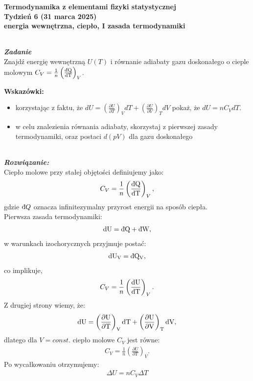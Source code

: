 \documentclass[11pt,a4paper]{article}
\newcounter{zadanie}\newcommand{\zadanie}[1][]{\addtocounter{zadanie}{1} ~\\  {\bf \emph{Zadanie \arabic{zadanie} #1 }} \\}
\newcounter{rozwiazanie}\newcommand{\rozwiazanie}[1][]{\addtocounter{rozwiazanie}{1} ~\\  {\bf \emph{Rozwiązanie: }} \\}
\newcommand{\dbar}{{\mkern3mu\mathchar'26\mkern-12mu d}}
\begin{document}

\begin{centering}
\bf{\Large{Termodynamika z elementami fizyki statystycznej}}\\
Tydzień 6  (31 marca 2025)\\[3mm]
energia wewnętrzna, ciepło, I zasada termodynamiki \\ 
\end{centering} 
\vspace{5mm}

\zadanie

Znajdź energię wewnętrzną $U(T)$ i równanie adiabaty gazu doskonałego o cieple molowym
$C_V = \frac{1}{n}\left( \frac{\rm{\dbar}Q}{\rm{d}T}\right)_V$.

\textbf{Wskazówki:}
\begin{itemize}
  \item korzystając z faktu, że
    $dU = \left(\frac{\partial U}{\partial T}\right)_V dT + \left(\frac{\partial U}{\partial V}\right)_T dV$
    pokaż, że $dU = n C_V dT$.
  \item w celu znalezienia równania adiabaty, skorzystaj z pierwszej zasady termodynamiki,
    oraz postaci $d(pV)$ dla gazu doskonałego\\
\end{itemize}


\vspace{5mm}
\rozwiazanie
Ciepło molowe przy stałej objętości definiujemy jako:
\begin{align}
C_V = \frac{1}{n}\left( \frac{\rm{\dbar}Q}{\rm{d}T}\right)_V,
\end{align}
gdzie ${\rm \dbar} Q$ oznacza infinitezymalny przyrost energii na sposób ciepła. \\
Pierwsza zasada termodynamiki:
\begin{align}
\rm{d}U = \rm{\dbar}Q + \rm{\dbar}W,
\end{align}
w warunkach izochorycznych przyjmuje postać:
\begin{align}
\rm{d}U_V = \rm{\dbar}Q _V, 
\end{align}
co implikuje,
\begin{align}
C_V = \frac{1}{n}\left( \frac{\rm{d}U}{\rm{d}T}\right)_V.
\end{align}
Z drugiej strony wiemy, że:
\begin{align*}
\rm{d}U = \left(\frac{\partial U}{\partial T} \right)_V \rm{d}T +  \left(\frac{\partial U}{\partial V} \right)_T \rm{d}V,
\end{align*}
dlatego dla $V=const.$ ciepło molowe $C_V$ jest równe:
\begin{align}
C_V = \frac{1}{n}\left( \frac{\partial U}{\partial T} \right)_V.
\end{align}
Po wycałkowaniu otrzymujemy:
\begin{align}
\Delta U = n C_V \Delta T 
\end{align}
\end{document}
